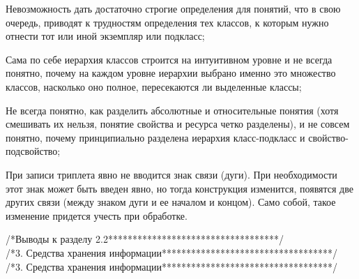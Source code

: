 \begin{SCn}
{\begin{scnitemize}
\begin{scnitemizeii}
			\item Невозможность дать достаточно строгие определения для понятий, что в свою очередь, приводят к трудностям определения тех классов, к которым нужно отнести тот или иной экземпляр или подкласс;
			\item Сама по себе иерархия классов строится на интуитивном уровне и не всегда понятно, почему на каждом уровне иерархии выбрано именно это множество классов, насколько оно полное, пересекаются ли выделенные классы;
			\item Не всегда понятно, как разделить абсолютные и относительные понятия (хотя смешивать их нельзя, понятие свойства и ресурса четко разделены), и не совсем понятно, почему принципиально разделена иерархия класс-подкласс и свойство-подсвойство;
		\end{scnitemizeii}
		\item При записи триплета явно не вводится знак связи (дуги). При необходимости этот знак может быть введен явно, но тогда конструкция изменится, появятся две других связи (между знаком дуги и ее началом и концом). Само собой, такое изменение придется учесть при обработке.
	\end{scnitemize}
}
/*Выводы к разделу 2.2***********************************/\\
/*3. Средства хранения информации***********************************/\\
/*3. Средства хранения информации***********************************/\\

\scnendstruct

\end{SCn}
